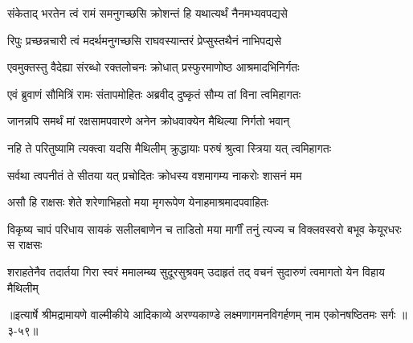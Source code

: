 \twolineshloka
{संकेताद् भरतेन त्वं रामं समनुगच्छसि}
{क्रोशन्तं हि यथात्यर्थं नैनमभ्यवपद्यसे} %

\twolineshloka
{रिपुः प्रच्छन्नचारी त्वं मदर्थमनुगच्छसि}
{राघवस्यान्तरं प्रेप्सुस्तथैनं नाभिपद्यसे} %

\twolineshloka
{एवमुक्तस्तु वैदेह्या संरब्धो रक्तलोचनः}
{क्रोधात् प्रस्फुरमाणोष्ठ आश्रमादभिनिर्गतः} %

\twolineshloka
{एवं ब्रुवाणं सौमित्रिं रामः संतापमोहितः}
{अब्रवीद् दुष्कृतं सौम्य तां विना त्वमिहागतः} %

\twolineshloka
{जानन्नपि समर्थं मां रक्षसामपवारणे}
{अनेन क्रोधवाक्येन मैथिल्या निर्गतो भवान्} %

\twolineshloka
{नहि ते परितुष्यामि त्यक्त्वा यदसि मैथिलीम्}
{क्रुद्धायाः परुषं श्रुत्वा स्त्रिया यत् त्वमिहागतः} %

\twolineshloka
{सर्वथा त्वपनीतं ते सीतया यत् प्रचोदितः}
{क्रोधस्य वशमागम्य नाकरोः शासनं मम} %

\twolineshloka
{असौ हि राक्षसः शेते शरेणाभिहतो मया}
{मृगरूपेण येनाहमाश्रमादपवाहितः} %

\twolineshloka
{विकृष्य चापं परिधाय सायकं सलीलबाणेन च ताडितो मया}
{मार्गीं तनुं त्यज्य च विक्लवस्वरो बभूव केयूरधरः स राक्षसः} %

\twolineshloka
{शराहतेनैव तदार्तया गिरा स्वरं ममालम्ब्य सुदूरसुश्रवम्}
{उदाहृतं तद् वचनं सुदारुणं त्वमागतो येन विहाय मैथिलीम्} %


॥इत्यार्षे श्रीमद्रामायणे वाल्मीकीये आदिकाव्ये अरण्यकाण्डे लक्ष्मणागमनविगर्हणम् नाम एकोनषष्ठितमः सर्गः ॥३-५९॥
